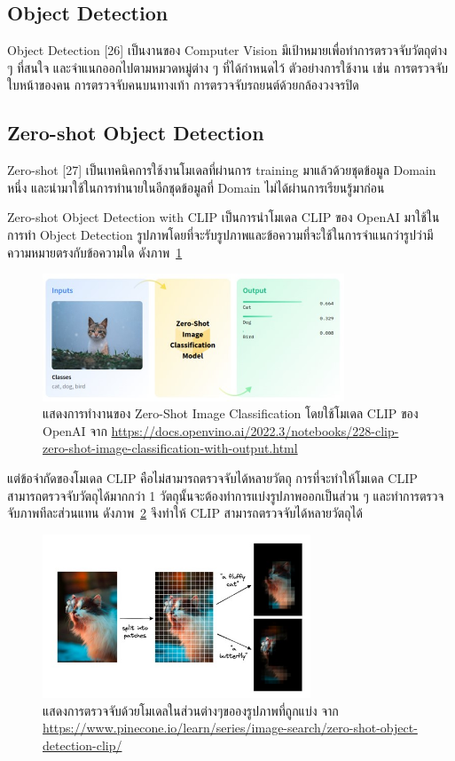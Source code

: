 \documentclass[12pt,oneside,openright,a4paper]{cpe-thai-project}
\begin{document}
\subsection{Object Detection}
\hspace {18pt}Object Detection [26]  เป็นงานของ Computer Vision มีเป้าหมายเพื่อทำการตรวจจับวัตถุต่าง ๆ ที่สนใจ และจำแนกออกไปตามหมวดหมู่ต่าง ๆ ที่ได้กำหนดไว้ ตัวอย่างการใช้งาน เช่น การตรวจจับใบหน้าของคน การตรวจจับคนบนทางเท้า การตรวจจับรถยนต์ด้วยกล้องวงจรปิด

\subsection{Zero-shot Object Detection}
\hspace {18pt} Zero-shot [27] เป็นเทคนิคการใช้งานโมเดลที่ผ่านการ training มาแล้วด้วยชุดข้อมูล Domain หนึ่ง และนำมาใช้ในการทำนายในอีกชุดข้อมูลที่ Domain ไม่ได้ผ่านการเรียนรู้มาก่อน

\hspace {18pt}Zero-shot Object Detection with CLIP เป็นการนำโมเดล CLIP ของ OpenAI มาใช้ในการทำ Object Detection รูปภาพโดยที่จะรับรูปภาพและข้อความที่จะใช้ในการจำแนกว่ารูปว่ามีความหมายตรงกับข้อความใด ดังภาพ~\ref{fig:zero-shot}


\begin{figure}[!h]\centering
\includegraphics[width=9cm]{image/zero-shot.jpg}
\caption{แสดงการทำงานของ Zero-Shot Image Classification โดยใช้โมเดล CLIP ของ OpenAI จาก \url{https://docs.openvino.ai/2022.3/notebooks/228-clip-zero-shot-image-classification-with-output.html}}
\label{fig:zero-shot}
\end{figure}

แต่ข้อจำกัดของโมเดล CLIP คือไม่สามารถตรวจจับได้หลายวัตถุ การที่จะทำให้โมเดล CLIP สามารถตรวจจับวัตถุได้มากกว่า 1 วัตถุนั้นจะต้องทำการแบ่งรูปภาพออกเป็นส่วน ๆ และทำการตรวจจับภาพทีละส่วนแทน 
ดังภาพ~\ref{fig:zero-shot-model} จึงทำให้ CLIP สามารถตรวจจับได้หลายวัตถุได้

\begin{figure}[!h]\centering
\includegraphics[width=8cm]{image/zero-shot-model.jpg}
\caption{แสดงการตรวจจับด้วยโมเดลในส่วนต่างๆขอองรูปภาพที่ถูกแบ่ง จาก \url{https://www.pinecone.io/learn/series/image-search/zero-shot-object-detection-clip/}}
\label{fig:zero-shot-model}
\end{figure}
\end{document}
